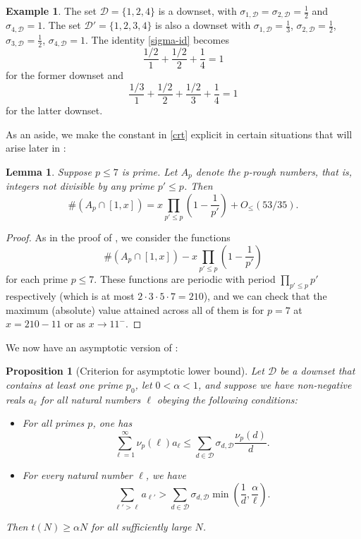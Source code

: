 \documentclass[10pt,a4paper,reqno]{amsart}
\numberwithin{equation}{section}
\theoremstyle{plain}
\newtheorem{proposition}[proposition]{Proposition}
\newtheorem{lemma}[lemma]{Lemma}
\theoremstyle{definition}
\newtheorem{example}[example]{Example}
\begin{document}
\begin{example}  The set ${\mathcal D} = \{1,2,4\}$ is a downset, with $\sigma_{1,{\mathcal D}} = \sigma_{2,{\mathcal D}} = \frac{1}{2}$ and $\sigma_{4,\mathcal D} = 1$.  The set ${\mathcal D}' = \{1,2,3,4\}$ is also a downset with $\sigma_{1,{\mathcal D}} = \frac{1}{3}$, $\sigma_{2,{\mathcal D}} = \frac{1}{2}$, $\sigma_{3,{\mathcal D}} = \frac{1}{2}$, $\sigma_{4,{\mathcal D}} = 1$.  The identity \eqref{sigma-id} becomes
$$ \frac{1/2}{1} + \frac{1/2}{2} + \frac{1}{4} = 1$$
for the former downset and
$$ \frac{1/3}{1} + \frac{1/2}{2} + \frac{1/2}{3} + \frac{1}{4} = 1$$
for the latter downset.
\end{example}

As an aside, we make the constant in \eqref{crt} explicit in certain situations that will arise later in :
\begin{lemma} \label{lit7}
  Suppose $p\le 7$ is prime.  Let $A_{p}$ denote the $p$-rough numbers, that is, integers not divisible by any prime $p'\le p$.  Then
  $$ \#(A_{p}\cap[1,x]) = x\prod_{p'\le p} \left(1-\frac{1}{p'}\right) + O_{\le}(53/35). $$
\end{lemma}
\begin{proof}
  As in the proof of , we consider the functions $$\#(A_{p}\cap[1,x]) - x\prod_{p'\le p} \left(1-\frac{1}{p'}\right)$$
  for each prime $p\le 7$.
  These functions are periodic with period $\prod_{p'\le p} p'$ respectively (which is at most $2\cdot 3\cdot 5\cdot 7=210$), and we can check that the maximum (absolute) value attained across all of them is for $p=7$ at $x=210-11$ or as $x\to 11^{-}$.
\end{proof}

We now have an asymptotic version of :

\begin{proposition}[Criterion for asymptotic lower bound]\label{asym-crit}  Let ${\mathcal D}$ be a downset that contains at least one prime $p_0$, let $0  < \alpha < 1$, and suppose we have non-negative reals $a_\ell$ for all natural numbers $\ell$ obeying the following conditions:
\begin{itemize}
\item[(i)]  For all primes $p$, one has
\begin{equation}\label{i-eq}
   \sum_{\ell=1}^\infty \nu_p(\ell) a_\ell  \leq \sum_{d \in {\mathcal D}} \sigma_{d,{\mathcal D}} \frac{\nu_p(d)}{d}.
\end{equation}
\item[(ii)]  For every natural number $\ell$, we have
\begin{equation}\label{l-eq} \sum_{\ell' > \ell} a_{\ell'} > \sum_{d \in {\mathcal D}} \sigma_{d,{\mathcal D}} \min\left( \frac{1}{d}, \frac{\alpha}{\ell}\right).
\end{equation}
\end{itemize}
Then $t(N) \geq \alpha N$ for all sufficiently large $N$.
\end{proposition}
\end{document}
